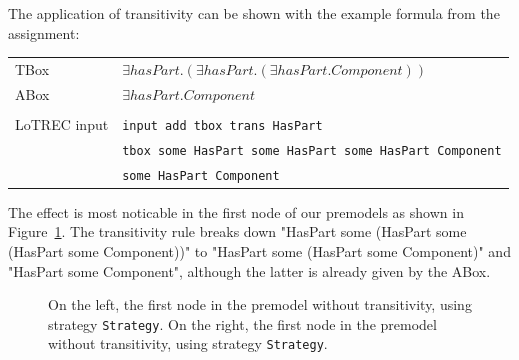 \documentclass[11pt]{article} %
\begin{document}
The application of transitivity can be shown with the example formula from the assignment:

\begin{table}[h]
\begin{center}
\begin{tabular}{l l}
TBox & $\exists{}hasPart.(\exists{}hasPart.(\exists{}hasPart.Component))$ \\
ABox & $\exists{}hasPart.Component$ \\
\\
LoTREC input & \texttt{input add tbox trans HasPart} \\
 & \texttt{tbox some HasPart some HasPart some HasPart Component}\\
 & \texttt{some HasPart Component} \\
\end{tabular}
\end{center}
\end{table}

The effect is most noticable in the first node of our premodels as shown in Figure~\ref{fig:transitivity}. The transitivity rule breaks down "HasPart some (HasPart some (HasPart some Component))" to "HasPart some (HasPart some Component)" and "HasPart some Component", although the latter is already given by the ABox.

\begin{figure}[h]
\begin{center}
\caption{On the left, the first node in the premodel without transitivity, using strategy \texttt{Strategy}. On the right, the first node in the premodel without transitivity, using strategy \texttt{Strategy}.}
\label{fig:transitivity}
\end{center}
\end{figure}
\end{document}
